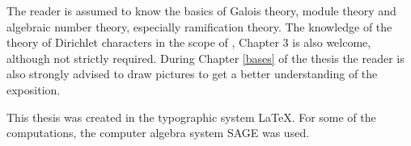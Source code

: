 The reader is assumed to know the basics of Galois theory, module theory and algebraic number theory, especially ramification theory. The knowledge of the theory of Dirichlet characters in the scope of \citep{washington1997}, Chapter 3 is also welcome, although not strictly required. During Chapter \ref{bases} of the thesis the reader is also strongly advised to draw pictures to get a better understanding of the exposition. \medskip

This thesis was created in the typographic system \LaTeX. For some of the computations, the computer algebra system SAGE was used.




